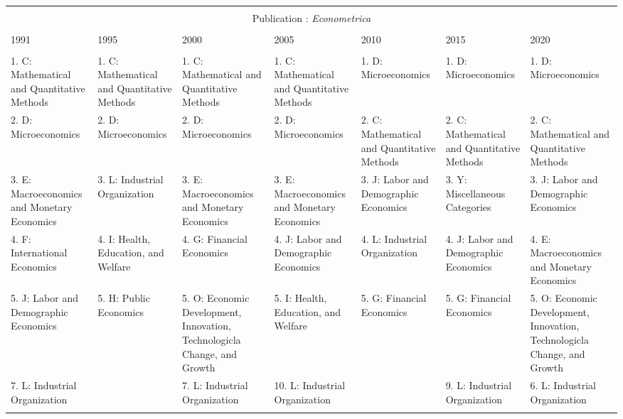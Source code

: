 
\begin{table}[h] \centering 
  \caption{} 
  \label{} 
\begin{tabular}{@{\extracolsep{5pt}} lllllll} 
\\[-1.8ex]\hline 
\hline \\[-1.8ex] \multicolumn{7}{c}{Publication : \textit{Econometrica}} \\
 \cline{1-7} \\
1991 & 1995 & 2000 & 2005 & 2010 & 2015 & 2020 \\ 
\hline \\[-1.8ex] 
1. C: Mathematical and Quantitative Methods & 1. C: Mathematical and Quantitative Methods & 1. C: Mathematical and Quantitative Methods & 1. C: Mathematical and Quantitative Methods & 1. D: Microeconomics & 1. D: Microeconomics & 1. D: Microeconomics \\ 
2. D: Microeconomics & 2. D: Microeconomics & 2. D: Microeconomics & 2. D: Microeconomics & 2. C: Mathematical and Quantitative Methods & 2. C: Mathematical and Quantitative Methods & 2. C: Mathematical and Quantitative Methods \\ 
3. E: Macroeconomics and Monetary Economics & 3. L: Industrial Organization & 3. E: Macroeconomics and Monetary Economics & 3. E: Macroeconomics and Monetary Economics & 3. J: Labor and Demographic Economics & 3. Y: Miscellaneous Categories & 3. J: Labor and Demographic Economics \\ 
4. F: International Economics & 4. I: Health, Education, and Welfare & 4. G: Financial Economics & 4. J: Labor and Demographic Economics & 4. L: Industrial Organization & 4. J: Labor and Demographic Economics & 4. E: Macroeconomics and Monetary Economics \\ 
5. J: Labor and Demographic Economics & 5. H: Public Economics & 5. O: Economic Development, Innovation, Technologicla Change, and Growth & 5. I: Health, Education, and Welfare & 5. G: Financial Economics & 5. G: Financial Economics & 5. O: Economic Development, Innovation, Technologicla Change, and Growth \\ 
7. L: Industrial Organization &  & 7. L: Industrial Organization & 10. L: Industrial Organization &  & 9. L: Industrial Organization & 6. L: Industrial Organization \\ 
\hline \\[-1.8ex] 
\end{tabular} 
\end{table} 
